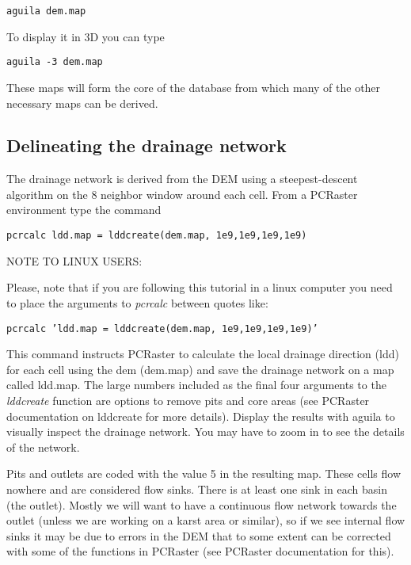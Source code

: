 \begin{verbatim}
aguila dem.map
\end{verbatim}  
  
To display it in 3D you can type 

\begin{verbatim}
aguila -3 dem.map
\end{verbatim}

These maps will form the core of the database from which many of the other necessary maps can be derived. 

\subsection{Delineating the drainage network}

The drainage network is derived from the DEM using a steepest-descent algorithm on the 8 neighbor window around each cell. From a PCRaster environment type the command

\begin{verbatim}
pcrcalc ldd.map = lddcreate(dem.map, 1e9,1e9,1e9,1e9)
\end{verbatim}

 \medskip 
\begin{Frame}
NOTE TO LINUX USERS:

Please, note that if you are following this tutorial in a linux computer you need to place the arguments to \textit{pcrcalc} between quotes like:

\texttt{pcrcalc 'ldd.map = lddcreate(dem.map, 1e9,1e9,1e9,1e9)'}
 
\end{Frame}
 \medskip

This command instructs PCRaster to calculate the local drainage direction (ldd) for each cell using the dem (\textsf{dem.map}) and save the drainage network on a map called \textsf{ldd.map}. The large numbers included as the final four arguments to the \emph{lddcreate} function are options to remove pits and core areas (see PCRaster documentation on lddcreate for more details). Display the results with aguila to visually inspect the drainage network. You may have to zoom in to see the details of the network. 

Pits and outlets are coded with the value 5 in the resulting map. These cells flow nowhere and are considered flow sinks. There is at least one sink in each basin (the outlet). Mostly we will want to have a continuous flow network towards the outlet (unless we are working on a karst area or similar), so if we see internal flow sinks it may be due to errors in the DEM that to some extent can be corrected with some of the functions in PCRaster (see PCRaster documentation for this).  

